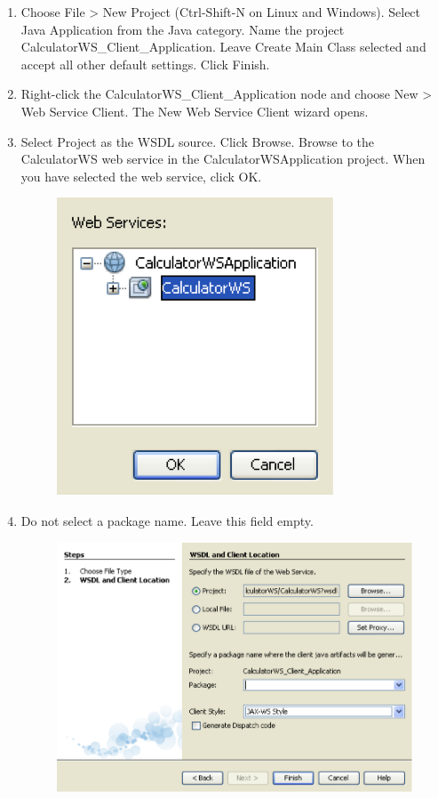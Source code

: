 \begin{enumerate}
\item Choose File > New Project (Ctrl-Shift-N on Linux and Windows). Select Java Application from the Java category. Name the project CalculatorWS_Client_Application. Leave Create Main Class selected and accept all other default settings. Click Finish.
\item Right-click the CalculatorWS_Client_Application node and choose New > Web Service Client. The New Web Service Client wizard opens. 
\item Select Project as the WSDL source. Click Browse. Browse to the CalculatorWS web service in the CalculatorWSApplication project. When you have selected the web service, click OK.

\begin{figure}
\begin{center}
\includegraphics[scale=1]{J11}
\label{J11}
\end{center}
\end{figure}

\item Do not select a package name. Leave this field empty.

\begin{figure}
\begin{center}
\includegraphics[scale=1]{J12}
\label{J12}
\end{center}
\end{figure}


\end{enumerate}
